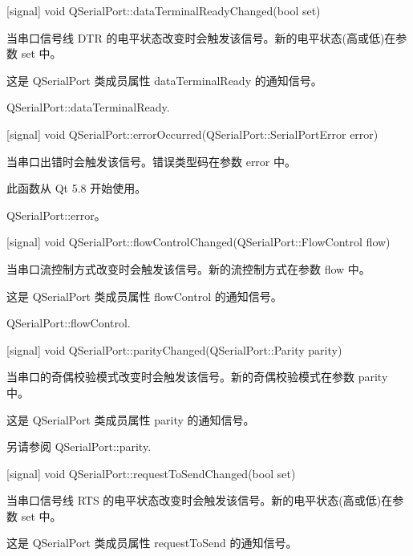 [signal] void QSerialPort::dataTerminalReadyChanged(bool set)

当串口信号线 DTR 的电平状态改变时会触发该信号。新的电平状态(高或低)在参数 set 中。

\begin{notice}
这是 QSerialPort 类成员属性 dataTerminalReady 的通知信号。
\end{notice}

\begin{seeAlso}
QSerialPort::dataTerminalReady.
\end{seeAlso}

[signal] void QSerialPort::errorOccurred(QSerialPort::SerialPortError error)

当串口出错时会触发该信号。错误类型码在参数 error 中。

此函数从 Qt 5.8 开始使用。

\begin{seeAlso}
QSerialPort::error。
\end{seeAlso}

[signal] void QSerialPort::flowControlChanged(QSerialPort::FlowControl flow)

当串口流控制方式改变时会触发该信号。新的流控制方式在参数 flow 中。

\begin{notice}
这是 QSerialPort 类成员属性 flowControl 的通知信号。
\end{notice}

\begin{seeAlso}
QSerialPort::flowControl.
\end{seeAlso}

[signal] void QSerialPort::parityChanged(QSerialPort::Parity parity)

当串口的奇偶校验模式改变时会触发该信号。新的奇偶校验模式在参数 parity 中。

\begin{notice}
这是 QSerialPort 类成员属性 parity 的通知信号。
\end{notice}

\begin{seeAlso}
另请参阅 QSerialPort::parity.
\end{seeAlso}

[signal] void QSerialPort::requestToSendChanged(bool set)

当串口信号线 RTS 的电平状态改变时会触发该信号。新的电平状态(高或低)在参数 set 中。

\begin{notice}
这是 QSerialPort 类成员属性 requestToSend 的通知信号。
\end{notice}

